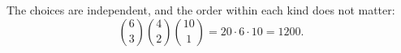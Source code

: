 The choices are independent, and the order within each kind does not matter:
\[
\binom63\binom42\binom{10}1=20\cdot6\cdot10=\boxed{1200}.
\]
